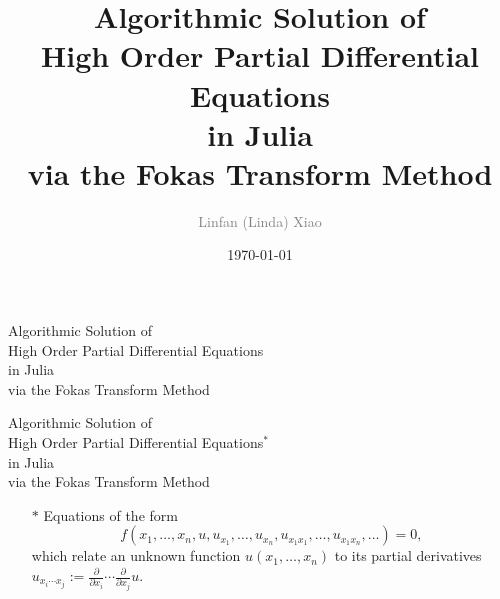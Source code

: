 \documentclass{beamer}
\title[]{Algorithmic Solution of \\High Order Partial Differential Equations\\in Julia\\ via the Fokas Transform Method} %
\author[]{\textcolor{gray}{Linfan (Linda) Xiao}} %
\institute[] %
{
Advisor: Prof. Dave Smith\\
Mathematical, Computational, and Statistical Sciences\\
Yale-NUS College \\ %
\medskip
}
\date[]{\today} %
\begin{document}
%
%

\begin{frame}
\titlepage %
\end{frame}

\begin{frame}[t]
    \begin{tcolorbox}[colback=white,colframe=gray!40, arc=0pt, outer arc=0pt]
        \begin{center}
            \Large Algorithmic Solution of \\
            High Order Partial Differential Equations\\
            in Julia\\
            via the Fokas Transform Method
        \end{center}
    \end{tcolorbox}
\end{frame}

\begin{frame}[t]
    \begin{tcolorbox}[colback=white,colframe=gray!40, arc=0pt, outer arc=0pt]
        \begin{center}
            \Large {\color{lightgray}Algorithmic Solution of \\
            High Order} Partial Differential Equations$^*$\\
            {\color{lightgray}in Julia\\
            via the Fokas Transform Method}
        \end{center}
    \end{tcolorbox}
    \begin{itemize}
        \item[$*$] Equations of the form 
        \[f\left(x_1,\ldots, x_n, u, u_{x_1},\ldots,u_{x_n},u_{x_1 x_1},\ldots,u_{x_1 x_n},\ldots \right) = 0,\]
        which relate an unknown function $u(x_1,\ldots,x_n)$ to its partial derivatives $u_{x_i\cdots x_j} := \frac{\partial}{\partial x_i}\cdots \frac{\partial}{\partial x_j}u$.
    \end{itemize}
\end{frame}
\end{document}
